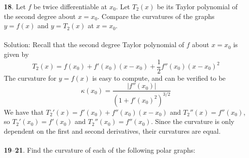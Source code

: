 \documentclass[12pt]{amsbook}
\begin{document}
{\small\bf 18}. Let $f$ be twice differentiable at $x_0$. Let $T_2(x)$ be its Taylor polynomial
of the second degree about $x = x_0$. Compare the curvatures of the graphs $y = f(x)$ and $y = T_2(x)$ at $x = x_0$.
\\
\\
{\sc Solution}: Recall that the second degree Taylor polynomial of $f$ about $x=x_0$ is given by
$$T_2(x)=f(x_0)+f'(x_0)(x-x_0)+\frac{1}{2}f''(x_0)(x-x_0)^2$$
The curvature for $y=f(x)$ is easy to compute, and can be verified to be
$$\kappa(x_0)=\frac{|f''(x_0)|}{(1+f'(x_0)^2)^{3/2}}$$
We have that $T_2'(x)=f'(x_0)+f''(x_0)(x-x_0)$ and $T_2''(x)=f''(x_0)$, so $T_2'(x_0)=f'(x_0)$ and $T_2''(x_0)=f''(x_0)$. Since the curvature is only dependent on the first and second derivatives, their curvatures are equal.
\\
\\
\noindent
{\small {\bf 19}--{\bf 21}}. Find the curvature of each of the following polar graphs:
\end{document}

